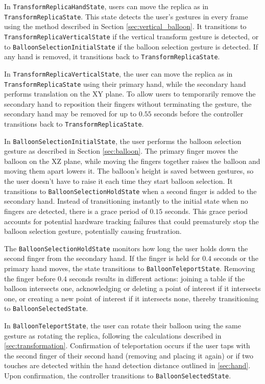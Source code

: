     In \lstinline{TransformReplicaHandState}, users can move the replica as in \lstinline{TransformReplicaState}. This state detects the user's gestures in every frame using the method described in Section \ref{sec:vertical_balloon}. It transitions to \lstinline{TransformReplicaVerticalState} if the vertical transform gesture is detected, or to \lstinline{BalloonSelectionInitialState} if the balloon selection gesture is detected. If any hand is removed, it transitions back to \lstinline{TransformReplicaState}.

    In \lstinline{TransformReplicaVerticalState}, the user can move the replica as in \lstinline{TransformReplicaState} using their primary hand, while the secondary hand performs translation on the XY plane. To allow users to temporarily remove the secondary hand to reposition their fingers without terminating the gesture, the secondary hand may be removed for up to $0.55$ seconds before the controller transitions back to \lstinline{TransformReplicaState}.

    In \lstinline{BalloonSelectionInitialState}, the user performs the balloon selection gesture as described in Section \ref{sec:balloon}. The primary finger moves the balloon on the XZ plane, while moving the fingers together raises the balloon and moving them apart lowers it. The balloon's height is saved between gestures, so the user doesn't have to raise it each time they start balloon selection. It transitions to \lstinline{BalloonSelectionHoldState} when a second finger is added to the secondary hand. Instead of transitioning instantly to the initial state when no fingers are detected, there is a grace period of $0.15$ seconds. This grace period accounts for potential hardware tracking failures that could prematurely stop the balloon selection gesture, potentially causing frustration.

    The \lstinline{BalloonSelectionHoldState} monitors how long the user holds down the second finger from the secondary hand. If the finger is held for $0.4$ seconds or the primary hand moves, the state transitions to \lstinline{BalloonTeleportState}. Removing the finger before $0.4$ seconds results in different actions: joining a table if the balloon intersects one, acknowledging or deleting a point of interest if it intersects one, or creating a new point of interest if it intersects none, thereby transitioning to \lstinline{BalloonSelectedState}.

    In \lstinline{BalloonTeleportState}, the user can rotate their balloon using the same gesture as rotating the replica, following the calculations described in \ref{sec:transformation}. Confirmation of teleportation occurs if the user taps with the second finger of their second hand (removing and placing it again) or if two touches are detected within the hand detection distance outlined in \ref{sec:hand}. Upon confirmation, the controller transitions to \lstinline{BalloonSelectedState}.
    
